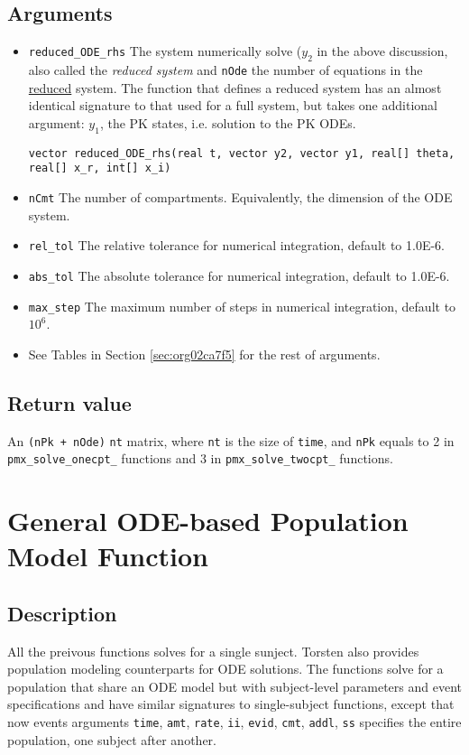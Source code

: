 \documentclass[12pt, reqno, oneside]{amsbook}
\numberwithin{equation}{chapter}
\numberwithin{figure}{chapter}
\numberwithin{table}{chapter}
\theoremstyle{remark}
\begin{document}
\subsection{Arguments}
\label{sec:org1b037b1}
\begin{itemize}
\item \texttt{reduced\_ODE\_rhs}
The system  numerically solve (\(y_2\) in the above discussion, also called the
\emph{reduced system} and \texttt{nOde} the number of equations in
the \uline{reduced} system. The function that defines a reduced
system has an almost identical signature to that used for a full
system, but takes one additional argument: \(y_1\), the PK states,
i.e. solution to the PK ODEs.
\begin{verbatim}
vector reduced_ODE_rhs(real t, vector y2, vector y1, real[] theta, real[] x_r, int[] x_i)
\end{verbatim}
\item \texttt{nCmt}
The number of compartments. Equivalently, the dimension of the ODE system.
\item \texttt{rel\_tol}
The relative tolerance for numerical integration, default to 1.0E-6.
\item \texttt{abs\_tol}
The absolute tolerance for numerical integration, default to 1.0E-6.
\item \texttt{max\_step}
The maximum number of steps in numerical integration, default to \(10^6\).
\item See Tables in Section \ref{sec:org02ca7f5} for the rest of arguments.
\end{itemize}
\subsection{Return value}
\label{sec:org84c1333}
An \texttt{(nPk + nOde)} \texttimes{} \texttt{nt} matrix, where \texttt{nt} is the size of
\texttt{time}, and \texttt{nPk} equals to 2 in
\texttt{pmx\_solve\_onecpt\_} functions
and 3 in \texttt{pmx\_solve\_twocpt\_} functions.

\section{General ODE-based Population Model Function}
\label{sec:org6157bc2}
\subsection{Description}
\label{sec:org208bcf5}
All the preivous functions solves for a single sunject. Torsten also
provides population modeling counterparts for ODE solutions. The
functions solve for a population that share an ODE model but with
subject-level parameters and event specifications and have similar
signatures to single-subject functions, except that now events
arguments \texttt{time}, \texttt{amt}, \texttt{rate}, \texttt{ii},
\texttt{evid}, \texttt{cmt},
\texttt{addl}, \texttt{ss} specifies the entire
population, one subject after another.
\end{document}
